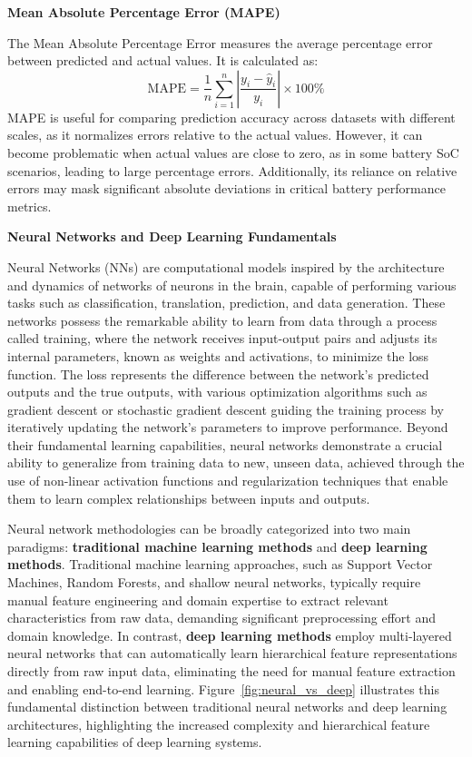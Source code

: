 \vspace{1cm}

\textbf{Mean Absolute Percentage Error (MAPE)}

The Mean Absolute Percentage Error measures the average percentage error between predicted and actual values. It is calculated as:
\begin{equation}
\text{MAPE} = \frac{1}{n} \sum_{i=1}^{n} \left| \frac{y_i - \hat{y}_i}{y_i} \right| \times 100\%
\end{equation}
MAPE is useful for comparing prediction accuracy across datasets with different scales, as it normalizes errors relative to the actual values. However, it can become problematic when actual values are close to zero, as in some battery SoC scenarios, leading to large percentage errors. Additionally, its reliance on relative errors may mask significant absolute deviations in critical battery performance metrics.

\vspace{1cm}

\textbf{Neural Networks and Deep Learning Fundamentals}

Neural Networks (NNs) are computational models inspired by the architecture and dynamics of networks of neurons in the brain, capable of performing various tasks such as classification, translation, prediction, and data generation. These networks possess the remarkable ability to learn from data through a process called training, where the network receives input-output pairs and adjusts its internal parameters, known as weights and activations, to minimize the loss function. The loss represents the difference between the network's predicted outputs and the true outputs, with various optimization algorithms such as gradient descent or stochastic gradient descent guiding the training process by iteratively updating the network's parameters to improve performance. Beyond their fundamental learning capabilities, neural networks demonstrate a crucial ability to generalize from training data to new, unseen data, achieved through the use of non-linear activation functions and regularization techniques that enable them to learn complex relationships between inputs and outputs.

Neural network methodologies can be broadly categorized into two main paradigms: \textbf{traditional machine learning methods} and \textbf{deep learning methods}. Traditional machine learning approaches, such as Support Vector Machines, Random Forests, and shallow neural networks, typically require manual feature engineering and domain expertise to extract relevant characteristics from raw data, demanding significant preprocessing effort and domain knowledge. In contrast, \textbf{deep learning methods} employ multi-layered neural networks that can automatically learn hierarchical feature representations directly from raw input data, eliminating the need for manual feature extraction and enabling end-to-end learning. Figure~\ref{fig:neural_vs_deep} illustrates this fundamental distinction between traditional neural networks and deep learning architectures, highlighting the increased complexity and hierarchical feature learning capabilities of deep learning systems.

